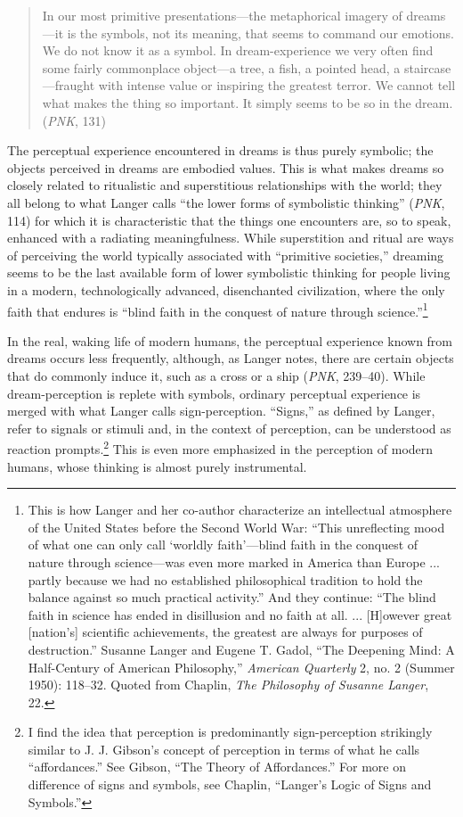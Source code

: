 \documentclass{tufte-handout}
\begin{document}
\begin{quote}
In our most primitive presentations---the metaphorical imagery of
dreams---it is the symbols, not its meaning, that seems to command our
emotions. We do not know it as a symbol. In dream-experience we very
often find some fairly commonplace object---a tree, a fish, a pointed
head, a staircase---fraught with intense value or inspiring the greatest
terror. We cannot tell what makes the thing so important. It simply
seems to be so in the dream. (\emph{PNK}, 131)
\end{quote}

\noindent The perceptual experience encountered in dreams is thus purely symbolic;
the objects perceived in dreams are embodied values. This is what makes
dreams so closely related to ritualistic and superstitious relationships
with the world; they all belong to what Langer calls ``the lower forms
of symbolistic thinking'' (\emph{PNK}, 114) for which it is
characteristic that the things one encounters are, so to speak, enhanced
with a radiating meaningfulness. While superstition and ritual are ways
of perceiving the world typically associated with ``primitive
societies,'' dreaming seems to be the last available form of lower
symbolistic thinking for people living in a modern, technologically
advanced, disenchanted civilization, where the only faith that endures
is ``blind faith in the conquest of nature through science.''\footnote{This
  is how Langer and her co-author characterize an intellectual
  atmosphere of the United States before the Second World War: ``This
  unreflecting mood of what one can only call `worldly faith'---blind
  faith in the conquest of nature through science---was even more marked
  in America than Europe ... partly because we had no established
  philosophical tradition to hold the balance against so much practical
  activity.'' And they continue: ``The blind faith in science has ended
  in disillusion and no faith at all. ... {[}H{]}owever great
  {[}nation's{]} scientific achievements, the greatest are always for
  purposes of destruction.'' Susanne Langer and Eugene T. Gadol, ``The
  Deepening Mind: A Half-Century of American Philosophy,''
  \emph{American Quarterly} 2, no. 2 (Summer 1950): 118--32. Quoted from
  Chaplin, \emph{The Philosophy of Susanne Langer}, 22.}

In the real, waking life of modern humans, the perceptual experience
known from dreams occurs less frequently, although, as Langer notes,
there are certain objects that do commonly induce it, such as a cross or
a ship (\emph{PNK}, 239--40). While dream-perception is replete with
symbols, ordinary perceptual experience is merged with what Langer calls
sign-perception. ``Signs,'' as defined by Langer, refer to signals or
stimuli and, in the context of perception, can be understood as reaction
prompts.\footnote{I find the idea that perception is predominantly
  sign-perception strikingly similar to J. J. Gibson's concept of
  perception in terms of what he calls ``affordances.'' See Gibson,
  ``The Theory of Affordances.'' For more on difference of signs and
  symbols, see Chaplin, ``Langer's Logic of Signs and Symbols.''} This
is even more emphasized in the perception of modern humans, whose
thinking is almost purely instrumental.
\end{document}
